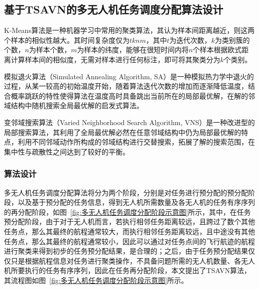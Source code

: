
\subsection{基于TSAVN的多无人机任务调度分配算法设计} \label{sec:TSAVN}

K-Means算法是一种机器学习中常用的聚类算法，其认为样本间距离越近，则这两个样本的相似性越大。其时间复杂度仅为\(tknm\)，其中\(t\)为迭代次数，\(k\)为类别簇的个数，\(n\)为样本个数，\(m\)为样本的纬度，能够在很短时间内将\(n\)个样本根据欧式距离计算样本间的相似度，无需对样本进行任何标注，即可将其聚类分为\(k\)个类别。

模拟退火算法（Simulated Annealing Algorithm, SA）是一种模拟热力学中退火的过程，从某一较高的初始温度开始，随着算法迭代次数的增加而逐渐降低温度，结合概率跳跃的特性使得算法在温度高时具备跳出当前所在的局部最优解，在解的邻域结构中随机搜索全局最优解的启发式算法。

变邻域搜索算法（Varied Neighborhood Search Algorithm, VNS）是一种改进型的局部搜索算法，其利用了全局最优解必然在任意邻域结构中仍为局部最优解的特点，利用不同邻域动作所构成的邻域结构进行交替搜索，拓展了解的搜索范围，在集中性与疏散性之间达到了较好的平衡。

\subsubsection{算法设计} 

多无人机任务调度分配算法将分为两个阶段，分别是对任务进行预分配的预分配阶段，以及基于预分配的任务信息，得到无人机所需数量及各无人机的任务有序序列的再分配阶段，如图~\ref{fig:多无人机任务调度分配阶段示意图}所示，其中，在任务预分配阶段，由于对于无人机而言，若执行相邻任务距离较远，且跨过了数个其他任务点，那么其最终的航程通常较大，而执行相邻任务距离较远，且中途没有其他任务点，那么其最终的航程通常较小，因此可以通过对任务点间的飞行航迹的航程进行聚类来得到初步的任务预分配结果，是合理的；之后，由于任务预分配结果仅仅只是根据航程信息对任务进行聚类操作，不具备问题所需的无人机数量、各无人机所要执行的任务有序序列，因此在任务再分配阶段，本文提出了TSAVN算法，其流程图如图~\ref{fig:多无人机任务调度分配阶段示意图}所示。

